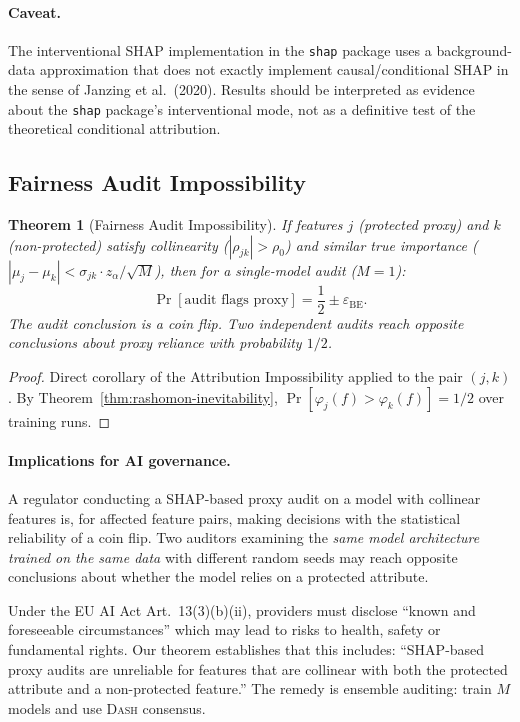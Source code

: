 \documentclass{article}
\newtheorem{theorem}{Theorem}
\newcommand{\DASH}{\textsc{Dash}}
\begin{document}
\paragraph{Caveat.}
The interventional SHAP implementation in the \texttt{shap} package uses a background-data approximation that does not exactly implement causal/conditional SHAP in the sense of Janzing et al.\ (2020). Results should be interpreted as evidence about the \texttt{shap} package's interventional mode, not as a definitive test of the theoretical conditional attribution.

\subsection{Fairness Audit Impossibility}
\label{sec:fairness}

\begin{theorem}[Fairness Audit Impossibility]
\label{thm:fairness-audit}
If features $j$ (protected proxy) and $k$ (non-protected) satisfy collinearity ($|\rho_{jk}| > \rho_0$) and similar true importance ($|\mu_j - \mu_k| < \sigma_{jk} \cdot z_\alpha / \sqrt{M}$), then for a single-model audit ($M{=}1$):
\[
    \Pr[\text{audit flags proxy}] = \frac{1}{2} \pm \varepsilon_{\text{BE}}.
\]
The audit conclusion is a coin flip. Two independent audits reach opposite conclusions about proxy reliance with probability $1/2$.
\end{theorem}

\begin{proof}
Direct corollary of the Attribution Impossibility applied to the pair $(j, k)$. By Theorem~\ref{thm:rashomon-inevitability}, $\Pr[\varphi_j(f) > \varphi_k(f)] = 1/2$ over training runs.
\end{proof}

\paragraph{Implications for AI governance.}
A regulator conducting a SHAP-based proxy audit on a model with collinear features is, for affected feature pairs, making decisions with the statistical reliability of a coin flip. Two auditors examining the \emph{same model architecture trained on the same data} with different random seeds may reach opposite conclusions about whether the model relies on a protected attribute.

Under the EU AI Act Art.~13(3)(b)(ii), providers must disclose ``known and foreseeable circumstances'' which may lead to risks to health, safety or fundamental rights. Our theorem establishes that this includes: ``SHAP-based proxy audits are unreliable for features that are collinear with both the protected attribute and a non-protected feature.'' The remedy is ensemble auditing: train $M$ models and use \DASH{} consensus.
\end{document}
